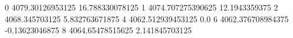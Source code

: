 0 4079.30126953125 16.788330078125
1 4074.707275390625 12.1943359375
2 4068.345703125 5.832763671875
4 4062.512939453125 0.0
6 4062.376708984375 -0.13623046875
8 4064.65478515625 2.141845703125
